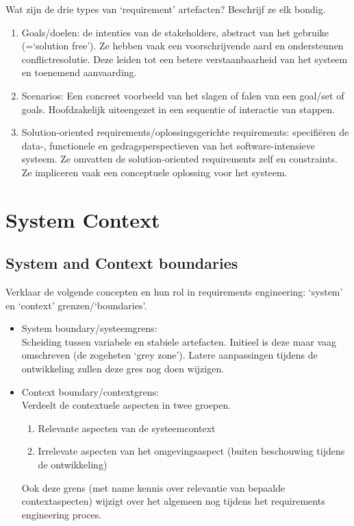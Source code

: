 \documentclass{article}
\begin{document}
\begin{quest}{}Wat zijn de drie types van `requirement' artefacten? Beschrijf ze elk bondig.
\end{quest}

\begin{enumerate}
	\item Goals/doelen: de intenties van de stakeholders, abstract van het gebruike (=`solution free'). Ze hebben vaak een voorschrijvende aard en ondersteunen conflictresolutie. Deze leiden tot een betere verstaanbaarheid van het systeem en toenemend aanvaarding.
	\item Scenarios: Een concreet voorbeeld van het slagen of falen van een goal/set of goals. Hoofdzakelijk uiteengezet in een sequentie of interactie van stappen.
	\item Solution-oriented requirements/oplossingsgerichte requirements: specifi\"eren de data-, functionele en gedragsperspectieven van het software-intensieve systeem. Ze omvatten de solution-oriented requirements zelf en constraints. Ze impliceren vaak een conceptuele oplossing voor het systeem.
\end{enumerate}


\section{System Context}

\subsection{System and Context boundaries}

\begin{quest}{}Verklaar de volgende concepten en hun rol in requirements engineering: `system' en `context' grenzen/`boundaries'.
\end{quest}

\begin{itemize}
    \item System boundary/systeemgrens:\\
     Scheiding tussen variabele en stabiele artefacten. Initieel is deze maar vaag omschreven (de zogeheten `grey zone'). Latere aanpassingen tijdens de ontwikkeling zullen deze gres nog doen wijzigen.
    \item Context boundary/contextgrens:\\
     Verdeelt de contextuele aspecten in twee groepen.
     \begin{enumerate}
     \item Relevante aspecten van de systeemcontext
     \item Irrelevate aspecten van het omgevingsaspect (buiten beschouwing tijdens de ontwikkeling)
     \end{enumerate}
     Ook deze grens (met name kennis over relevantie van bepaalde contextaspecten) wijzigt over het algemeen nog tijdens het requirements engineering proces. 
\end{itemize}
\end{document}
